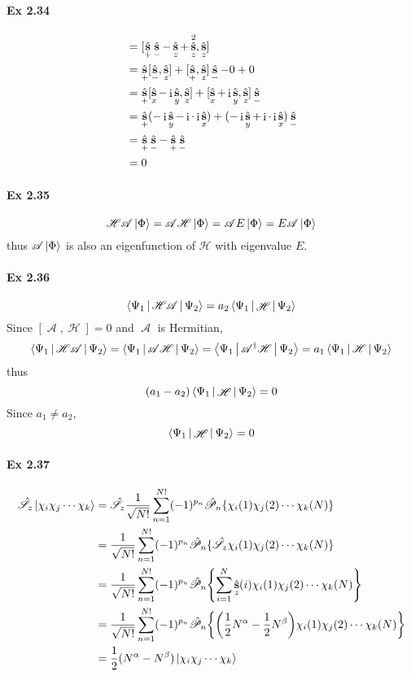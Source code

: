 \documentclass[a4paper]{article}
\DeclareMathOperator{\I}{\mathrm{i}}
\DeclareMathOperator{\hs}{\hat{\vb{s}}}
\DeclareMathOperator{\sH}{\mathscr{H}}
\DeclareMathOperator{\sA}{\mathscr{A}}
\newcommand{\hsP}{\hat{\mathscr{P}}}
\newcommand{\hsS}{\hat{\mathscr{S}}}
\newcommand{\ex}[1]{\paragraph{Ex #1}}
\numberwithin{equation}{subsection}
\begin{document}
\ex{2.34}
\begin{align}
[\hs^2, \hs_z] &= [\hs_+\hs_- - \hs_z + \hs_z^2, \hs_z] \notag\\
&= \hs_+[\hs_-, \hs_z] + [\hs_+, \hs_z]\hs_- - 0 + 0 \notag\\
&= \hs_+[\hs_x - \I\hs_y, \hs_z] + [\hs_x + \I\hs_y, \hs_z]\hs_- \notag\\
&= \hs_+(-\I\hs_y -\I\cdot\I\hs_x) + (-\I\hs_y + \I\cdot\I\hs_x)\hs_- \notag\\
&= \hs_+ \hs_- - \hs_+\hs_- \notag\\
&= 0
\end{align}

\ex{2.35}
\begin{equation}\label{key}
\mathscr{H} \mathscr{A}\ket{\Phi} =  \mathscr{A}\mathscr{H} \ket{\Phi} =  \mathscr{A} E \ket{\Phi} = E\mathscr{A} \ket{\Phi}
\end{equation}
thus $ \mathscr{A} \ket{\Phi} $ is also an eigenfunction of $ \mathscr{H} $ with eigenvalue $ E $.

\ex{2.36}
\begin{equation}\label{key}
\Braket{\Psi_1 | \mathscr{H} \mathscr{A} | \Psi_2} = a_2 \Braket{\Psi_1 | \sH | \Psi_2}
\end{equation}
Since $ [\sA, \sH]=0 $ and $ \sA $ is Hermitian,
\begin{equation}\label{key}
\Braket{\Psi_1 | \mathscr{H} \mathscr{A} | \Psi_2} = \Braket{\Psi_1 | \mathscr{A}\mathscr{H}  | \Psi_2} = \Braket{\Psi_1 | \mathscr{A}^\dagger \mathscr{H}  | \Psi_2} = a_1 \Braket{\Psi_1 | \mathscr{H} | \Psi_2}
\end{equation}
thus
\begin{equation}\label{key}
(a_1 - a_2) \Braket{\Psi_1 | \sH |\Psi_2} = 0
\end{equation}
Since $ a_1 \neq a_2 $,
\begin{equation}\label{key}
\Braket{\Psi_1 | \sH |\Psi_2} = 0
\end{equation}

\ex{2.37}
\begin{align}
\hsS_z \ket{\chi_i\chi_j\cdots\chi_k} &= \hsS_z \dfrac{1}{\sqrt{N!}}\sum_{n=1}^{N!}(-1)^{p_n} \hsP_n\{\chi_i(1)\chi_j(2)\cdots\chi_k(N)\} \notag\\
&= \dfrac{1}{\sqrt{N!}}\sum_{n=1}^{N!}(-1)^{p_n} \hsP_n\{\hsS_z \chi_i(1)\chi_j(2)\cdots\chi_k(N)\} \notag\\
&= \dfrac{1}{\sqrt{N!}}\sum_{n=1}^{N!}(-1)^{p_n} \hsP_n\qty{\sum_{i=1}^{N} \hs_z(i)\chi_i(1)\chi_j(2)\cdots\chi_k(N)} \notag\\
&= \dfrac{1}{\sqrt{N!}}\sum_{n=1}^{N!}(-1)^{p_n} \hsP_n\qty{\qty(\dfrac{1}{2}N^\alpha - \dfrac{1}{2}N^\beta)\chi_i(1)\chi_j(2)\cdots\chi_k(N)} \notag\\
&= \dfrac{1}{2}(N^\alpha - N^\beta) \ket{\chi_i\chi_j\cdots\chi_k} 
\end{align}
\end{document}

